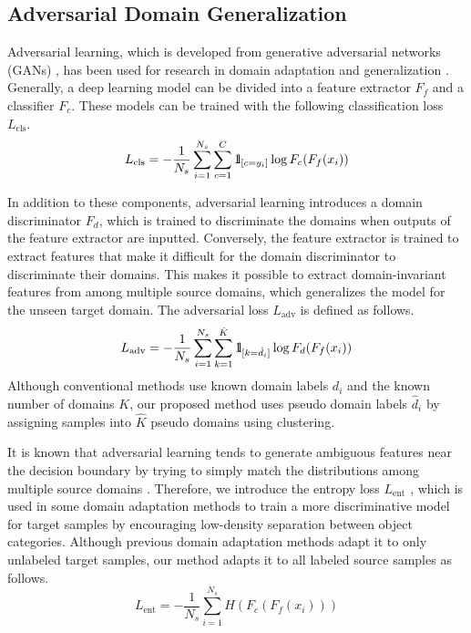 \documentclass[letterpaper]{article} \usepackage{aaai20}  \usepackage{times}  \usepackage{helvet} \usepackage{courier}  \usepackage[hyphens]{url}  \usepackage{graphicx} \urlstyle{rm} \def\UrlFont{\rm}  \usepackage{graphicx}  \usepackage[whole]{bxcjkjatype}
\begin{document}
\subsection{Adversarial Domain Generalization}
Adversarial learning, which is developed from generative adversarial networks (GANs) \cite{GAN}, has been used for research in domain adaptation \cite{GRL} and generalization \cite{CIDDG}.
Generally, a deep learning model can be divided into a feature extractor $F_f$ and a classifier $F_c$. These models can be trained with the following classification loss $L_{\mathrm{cls}}$.
\begin{equation}
   L_{\mathrm{cls}}=-\frac{1}{N_s}\sum_{i=1}^{N_s}\sum_{c=1}^{C}\mbox{1}\hspace{-0.25em}\mbox{l}_{[c=y_i]}\log F_c(F_f(x_i))
    \label{eq:class}
\end{equation}
\par
In addition to these components, adversarial learning introduces a domain discriminator $F_d$, which is trained to discriminate the domains when outputs of the feature extractor are inputted.
Conversely, the feature extractor is trained to extract features that make it difficult for the domain discriminator to discriminate their domains.
This makes it possible to extract domain-invariant features from among multiple source domains, which generalizes the model for the unseen target domain.
The adversarial loss $L_{\mathrm{adv}}$ is defined as follows.
\begin{equation}
    L_{\mathrm{adv}}=-\frac{1}{N_s}\sum_{i=1}^{N_s}\sum_{k=1}^{\hat{K}}\mbox{1}\hspace{-0.25em}\mbox{l}_{[k=\hat{d}_i]}\log F_d(F_f(x_i))
    \label{eq:adv}
\end{equation}
Although conventional methods use known domain labels $d_i$ and the known number of domains $K$, our proposed method uses pseudo domain labels $\hat{d}_i$ by assigning samples into $\hat{K}$ pseudo domains using clustering.\par
It is known that adversarial learning tends to generate ambiguous features near the decision boundary by trying to simply match the distributions among multiple source domains \cite{MCD}. Therefore, we introduce the entropy loss $L_{\mathrm{ent}}$ \cite{entropy}, which is used in some domain adaptation methods \cite{RTN,SymNets} to train a more discriminative model for target samples by encouraging low-density separation between object categories. Although previous domain adaptation methods adapt it to only unlabeled target samples, our method adapts it to all labeled source samples as follows.
\begin{equation}
L_{\mathrm{ent}}=-\frac{1}{N_s}\sum_{i=1}^{N_s}H(F_c(F_f(x_i)))
\label{eq:entropy}
\end{equation}
\end{document}

